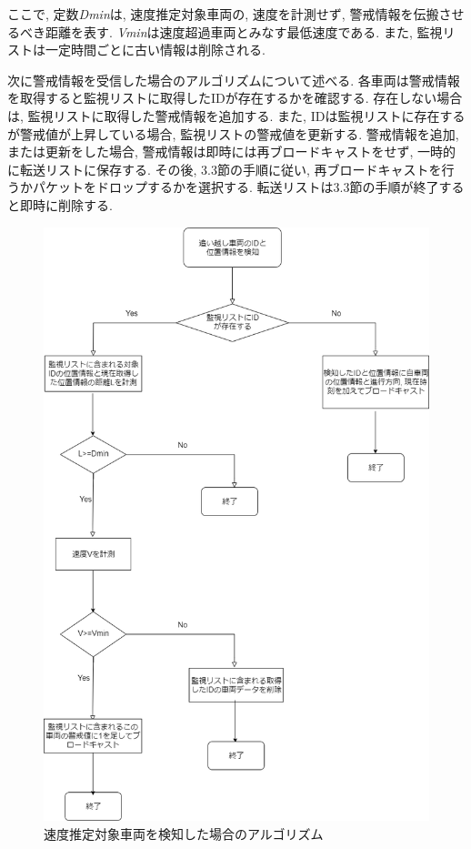 \documentclass[10pt]{jreport}
\begin{document}
ここで, 定数{\it Dmin}は, 速度推定対象車両の, 速度を計測せず, 警戒情報を伝搬させるべき距離を表す. {\it Vmin}は速度超過車両とみなす最低速度である. また, 監視リストは一定時間ごとに古い情報は削除される. 

次に警戒情報を受信した場合のアルゴリズムについて述べる. 各車両は警戒情報を取得すると監視リストに取得したIDが存在するかを確認する. 存在しない場合は, 監視リストに取得した警戒情報を追加する. また, IDは監視リストに存在するが警戒値が上昇している場合, 監視リストの警戒値を更新する. 警戒情報を追加, または更新をした場合, 警戒情報は即時には再ブロードキャストをせず, 一時的に転送リストに保存する. その後, 3.3節の手順に従い, 再ブロードキャストを行うかパケットをドロップするかを選択する. 転送リストは3.3節の手順が終了すると即時に削除する. 
\begin{figure}[H]
\centering
\includegraphics[width=12cm]{figures/detect3_2_2.png}
\caption{速度推定対象車両を検知した場合のアルゴリズム}
\label{fig:detection}
\end{figure}
\end{document}
